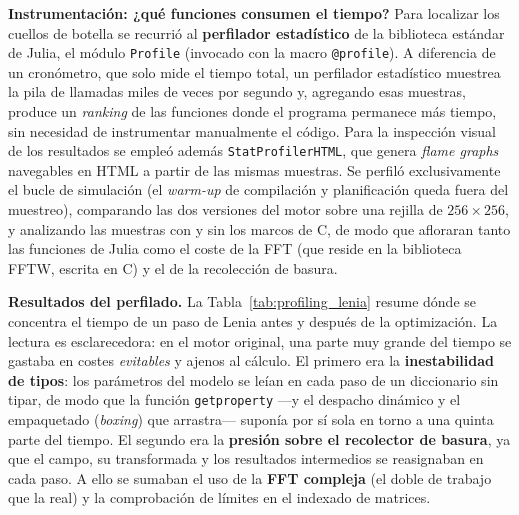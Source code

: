 \textbf{Instrumentación: ¿qué funciones consumen el tiempo?}
Para localizar los cuellos de botella se recurrió al \textbf{perfilador
estadístico} de la biblioteca estándar de Julia, el módulo \texttt{Profile}
(invocado con la macro \texttt{@profile}). A diferencia de un cronómetro, que
solo mide el tiempo total, un perfilador estadístico muestrea la pila de
llamadas miles de veces por segundo y, agregando esas muestras, produce un
\textit{ranking} de las funciones donde el programa permanece más tiempo, sin
necesidad de instrumentar manualmente el código. Para la inspección visual de
los resultados se empleó además \texttt{StatProfilerHTML}, que genera
\textit{flame graphs} navegables en HTML a partir de las mismas muestras. Se
perfiló exclusivamente el bucle de simulación (el \textit{warm-up} de compilación
y planificación queda fuera del muestreo), comparando las dos versiones del motor
sobre una rejilla de $256\times256$, y analizando las muestras con y sin los
marcos de C, de modo que afloraran tanto las funciones de Julia como el coste de
la FFT (que reside en la biblioteca FFTW, escrita en C) y el de la recolección de
basura.

\textbf{Resultados del perfilado.}
La Tabla~\ref{tab:profiling_lenia} resume dónde se concentra el tiempo de un paso
de Lenia antes y después de la optimización. La lectura es esclarecedora: en el
motor original, una parte muy grande del tiempo se gastaba en costes
\emph{evitables} y ajenos al cálculo. El primero era la \textbf{inestabilidad de
tipos}: los parámetros del modelo se leían en cada paso de un diccionario sin
tipar, de modo que la función \texttt{getproperty} —y el despacho dinámico y el
empaquetado (\textit{boxing}) que arrastra— suponía por sí sola en torno a una
quinta parte del tiempo. El segundo era la \textbf{presión sobre el recolector de
basura}, ya que el campo, su transformada y los resultados intermedios se
reasignaban en cada paso. A ello se sumaban el uso de la \textbf{FFT compleja}
(el doble de trabajo que la real) y la comprobación de límites en el indexado de
matrices.

